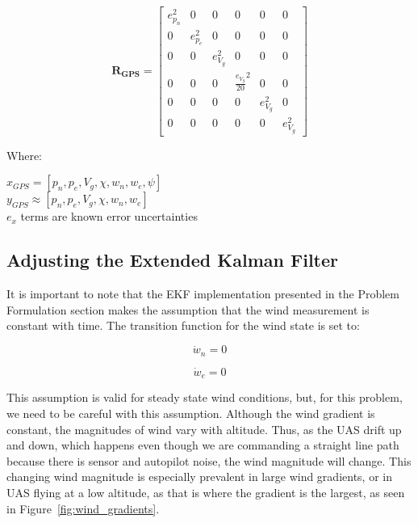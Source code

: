 \begin{equation}
    \mathbf{R_{GPS}} = \begin{bmatrix}
        e_{p_{n}}^2 & 0 & 0 & 0 & 0 & 0 \\
        0 & e_{p_{e}}^2 & 0 & 0 & 0 & 0 \\
        0 & 0 & e_{V_g}^2 & 0 & 0 & 0 \\
        0 & 0 & 0 & \frac{e_{V_g}}{20}^2 & 0 & 0\\ 
        0 & 0 & 0 & 0 & e_{V_{g}}^2 & 0 \\
        0 & 0 & 0 & 0 & 0 & e_{V_{g}}^2 
    \end{bmatrix}
\end{equation}

Where:
\begin{center}
$x_{GPS} = [p_{n}, p_{e}, V_{g}, \chi, w_n, w_e, \psi]$ \\
$y_{GPS} \approx [p_{n}, p_{e}, V_{g}, \chi, w_n, w_e]$ \\
$e_{x}$ terms are known error uncertainties
\end{center}

\subsection{Adjusting the Extended Kalman Filter}

It is important to note that the EKF implementation presented in the Problem Formulation section makes the assumption that the wind measurement is constant with time.
The transition function for the wind state is set to:

\begin{equation}
    \dot{w}_n = 0
\end{equation}

\begin{equation}
    \dot{w}_e = 0
\end{equation}

This assumption is valid for steady state wind conditions, but, for this problem, we need to be careful with this assumption.
Although the wind gradient is constant, the magnitudes of wind vary with altitude. 
Thus, as the UAS drift up and down, which happens even though we are commanding a straight line path because there is sensor and autopilot noise, the wind magnitude will change.
This changing wind magnitude is especially prevalent in large wind gradients, or in UAS flying at a low altitude, as that is where the gradient is the largest, as seen in Figure~\ref{fig:wind_gradients}.

